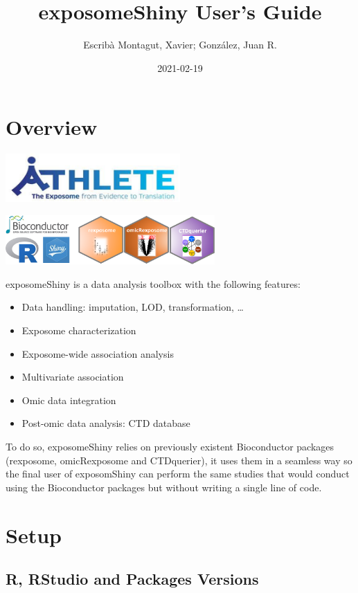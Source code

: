 \documentclass[
]{book}
\title{exposomeShiny User's Guide}
\author{Escribà Montagut, Xavier; González, Juan R.}
\date{2021-02-19}
\providecommand{\tightlist}{%
  \setlength{\itemsep}{0pt}\setlength{\parskip}{0pt}}
\begin{document}
\maketitle

{
\setcounter{tocdepth}{1}
\tableofcontents
}
\hypertarget{overview}{%
\chapter{Overview}\label{overview}}

\includegraphics[width=0.5\textwidth,height=\textheight]{images/athlete.png}

\includegraphics[width=0.6\textwidth,height=\textheight]{images/logo.png}

exposomeShiny is a data analysis toolbox with the following features:

\begin{itemize}
\tightlist
\item
  Data handling: imputation, LOD, transformation, \ldots{}
\item
  Exposome characterization
\item
  Exposome-wide association analysis
\item
  Multivariate association
\item
  Omic data integration
\item
  Post-omic data analysis: CTD database
\end{itemize}

To do so, exposomeShiny relies on previously existent Bioconductor packages (rexposome, omicRexposome and CTDquerier), it uses them in a seamless way so the final user of exposomShiny can perform the same studies that would conduct using the Bioconductor packages but without writing a single line of code.

\hypertarget{setup}{%
\chapter{Setup}\label{setup}}

\hypertarget{r-rstudio-and-packages-versions}{%
\section{R, RStudio and Packages Versions}\label{r-rstudio-and-packages-versions}}
\end{document}
